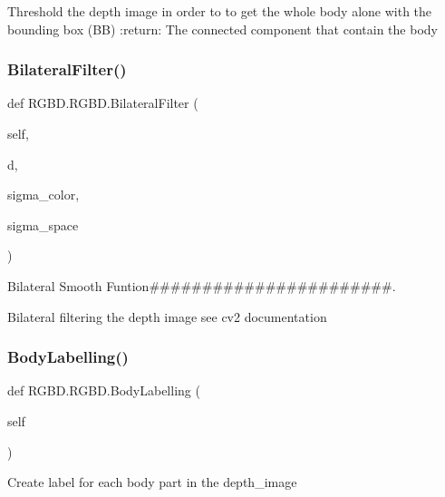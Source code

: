 \begin{DoxyVerb}Threshold the depth image in order to to get the whole body alone with the bounding box (BB)
:return: The connected component that contain the body
\end{DoxyVerb}
 \mbox{\label{class_r_g_b_d_1_1_r_g_b_d_a8009d6498ed9607e5fb86d8085244d4f}} 
\subsubsection{\texorpdfstring{Bilateral\+Filter()}{BilateralFilter()}}
{\footnotesize\ttfamily def R\+G\+B\+D.\+R\+G\+B\+D.\+Bilateral\+Filter (\begin{DoxyParamCaption}\item[{}]{self,  }\item[{}]{d,  }\item[{}]{sigma\+\_\+color,  }\item[{}]{sigma\+\_\+space }\end{DoxyParamCaption})}



Bilateral Smooth Funtion\#\#\#\#\#\#\#\#\#\#\#\#\#\#\#\#\#\#\#\#\#\#\#. 

\begin{DoxyVerb}Bilateral filtering the depth image
see cv2 documentation
\end{DoxyVerb}
 \mbox{\label{class_r_g_b_d_1_1_r_g_b_d_a752dd9b82235dce29c270462a8c38556}} 
\subsubsection{\texorpdfstring{Body\+Labelling()}{BodyLabelling()}}
{\footnotesize\ttfamily def R\+G\+B\+D.\+R\+G\+B\+D.\+Body\+Labelling (\begin{DoxyParamCaption}\item[{}]{self }\end{DoxyParamCaption})}

\begin{DoxyVerb}Create label for each body part in the depth_image\end{DoxyVerb}
 \mbox{\label{class_r_g_b_d_1_1_r_g_b_d_aeed6372b3733ba2f4291f2cf187c7455}} 
